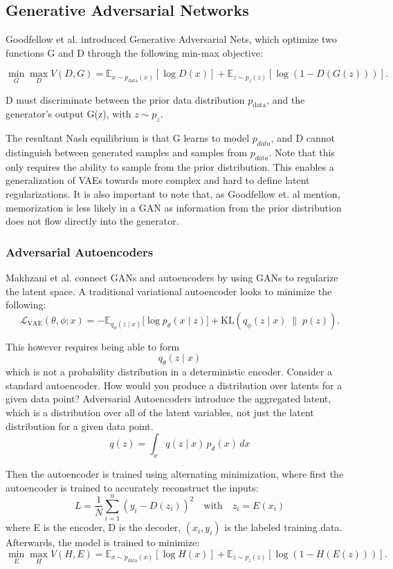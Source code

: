 \documentclass[11pt]{article}
\theoremstyle{definition}
\begin{document}
\subsection{Generative Adversarial Networks}
Goodfellow et al. introduced Generative Adversarial Nets, which optimize two functions G and D through the following min-max objective:

\[
\min_G \max_D V(D,G)
=
\mathbb{E}_{x \sim p_{\text{data}}(x)}
\left[\log D(x)\right]
+
\mathbb{E}_{z \sim p_z(z)}
\left[\log\left(1 - D(G(z))\right)\right].
\]

D must discriminate between the prior data distribution \(p_{\text{data}}\), and the generator's output G(z), with \(z \sim p_z\). 

The resultant Nash equilibrium is that G learns to model \(p_{data}\), and D cannot distinguish between generated samples and samples from \(p_{data}\). Note that this only requires the ability to sample from the prior distribution. This enables a generalization of VAEs towards more complex and hard to define latent regularizations. It is also important to note that, as Goodfellow et. al mention, memorization is less likely in a GAN as information from the prior distribution does not flow directly into the generator.

\subsubsection{Adversarial Autoencoders}
Makhzani et al. connect GANs and autoencoders by using GANs to regularize the latent space. A traditional variational autoencoder looks to minimize the following:
\[
    \mathcal{L}_{\mathrm{VAE}}(\theta,\phi;x)
    = -\mathbb{E}_{q_\phi(z\mid x)}\big[\log p_\theta(x\mid z)\big]
      + \mathrm{KL}\!\left(q_\phi(z\mid x)\;\|\;p(z)\right).
\]

This however requires being able to form \[q_\theta(z\mid x)\] which is not a probability distribution in a deterministic encoder. Consider a standard autoencoder. How would you produce a distribution over latents for a given data point? Adversarial Autoencoders introduce the aggregated latent, which is a distribution over all of the latent variables, not just the latent distribution for a given data point.
\[
q(z) = \int_x q(z \mid x)\, p_d(x)\, dx
\]

Then the autoencoder is trained using alternating minimization, where first the autoencoder is trained to accurately reconstruct the inputs:
\[
L = \frac{1}{N}\sum_{i=1}^{n} (y_i-D(z_i))^2 \quad \text{with} \quad z_i = E(x_i)
\]
where E is the encoder, D is the decoder, $(x_i, y_i)$ is the labeled training data.
Afterwards, the model is trained to minimize:
\[
\min_E \max_H V(H,E)
=
\mathbb{E}_{x \sim p_{\text{data}}(x)}
\left[\log H(x)\right]
+
\mathbb{E}_{z \sim p_z(z)}
\left[\log\left(1 - H(E(z))\right)\right].
\]
\end{document}
